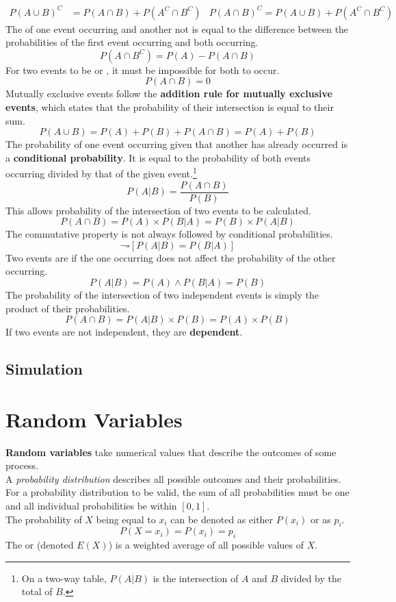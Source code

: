 \documentclass[../AP_Statistics.tex]{subfiles}
\begin{document}
		\begin{align*}
			P(A\cup B)^C &= P(A\cap B) + P\left(A^C\cap B^C\right)	& P(A\cap B)^C = P(A\cup B) + P\left(A^C \cap B^C\right)
			\end{align*}
		The  of one event occurring and another not is equal to the difference between the probabilities of the first event occurring and both occurring.
		\[P\left(A\cap B^C\right) = P(A) - P(A\cap B)\]
		For two events to be  or , it must be impossible for both to occur.
		\[P(A\cap B) = 0\]
		Mutually exclusive events follow the \textbf{addition rule for mutually exclusive events}, which states that the probability of their intersection is equal to their sum.
		\[P(A\cup B) = P(A) + P(B) + P(A\cap B) = P(A) + P(B)\]
		The probability of one event occurring given that another has already occurred is a \textbf{conditional probability}. It is equal to the probability of both events occurring divided by that of the given event.\footnote{On a two-way table, $P(A|B)$ is the intersection of $A$ and $B$ divided by the total of $B$.}
		\[P(A|B) = \frac{P(A\cap B)}{P(B)}\]
		This allows probability of the intersection of two events to be calculated.
		\[P(A\cap B) = P(A) \times P(B|A) = P(B) \times P(A|B)\]
		The commutative property is not always followed by conditional probabilities.
		\[\lnot\square[P(A|B) = P(B|A)]\]
		Two events are  if the one occurring does not affect the probability of the other occurring.
		\[P(A|B) = P(A) \land P(B|A) = P(B)\]
		The probability of the intersection of two independent events is simply the product of their probabilities.
		\[P(A\cap B) = P(A|B) \times P(B) = P(A) \times P(B)\]
		If two events are not independent, they are \textbf{dependent}.
		\section*{Simulation}
	\chapter{Random Variables}
		\textbf{Random variables} take numerical values that describe the outcomes of some  process. \\
		A \emph{probability distribution} describes all possible outcomes and their probabilities. \\
		For a probability distribution to be valid, the sum of all probabilities must be one and all individual probabilities be within $[0,1]$. \\
		The probability of $X$ being equal to $x_i$ can be denoted as either $P(x_i)$ or as $p_i$.
		\[P(X = x_i) = P(x_i) = p_i\]
		The  or  (denoted $E(X)$) is a weighted average of all possible values of $X$.
\end{document}
